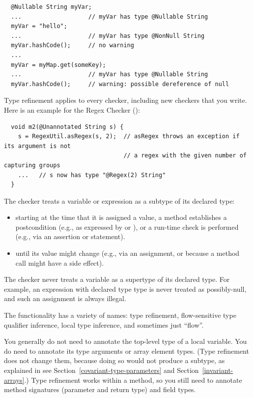 \begin{Verbatim}
  @Nullable String myVar;
  ...                   // myVar has type @Nullable String
  myVar = "hello";
  ...                   // myVar has type @NonNull String
  myVar.hashCode();     // no warning
  ...
  myVar = myMap.get(someKey);
  ...                   // myVar has type @Nullable String
  myVar.hashCode();     // warning: possible dereference of null
\end{Verbatim}

Type refinement applies to every checker, including new
checkers that you write.  Here is an example for the Regex Checker
():

\begin{Verbatim}
  void m2(@Unannotated String s) {
    s = RegexUtil.asRegex(s, 2);  // asRegex throws an exception if its argument is not
                                  // a regex with the given number of capturing groups
    ...   // s now has type "@Regex(2) String"
  }
\end{Verbatim}



The checker treats a variable or expression as a subtype of its declared type:
\begin{itemize}
\item
  starting at the time that
  it is assigned a value,
  a method establishes a postcondition (e.g., as
  expressed by  or
  ), or
  a run-time check is performed (e.g., via an assertion or
   statement).
\item
until its value might change (e.g.,
via an assignment, or because a method call might have a side effect).
\end{itemize}

The checker never treats a variable as
a supertype of its declared type.  For example, an expression with declared type 
type is never treated as possibly-null, and such an assignment is always illegal.

The functionality has a variety of names:  type refinement,
flow-sensitive type qualifier inference, local type inference, and
sometimes just ``flow''.



You generally do not need to annotate the top-level type of a local variable.
You do need to annotate its type arguments or array element types.
(Type refinement does not change them, because doing so would not produce a
subtype, as explained in see Section~\ref{covariant-type-parameters} and
Section~\ref{invariant-arrays}.)
Type refinement works within a method, so you still need to
annotate method signatures (parameter and return type) and field types.

